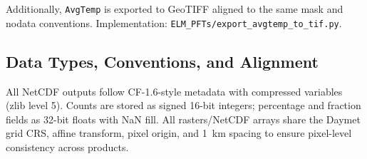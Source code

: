 Additionally, \texttt{AvgTemp} is exported to GeoTIFF aligned to the same mask and nodata conventions. Implementation: \texttt{ELM\_PFTs/export\_avgtemp\_to\_tif.py}.

\subsection{Data Types, Conventions, and Alignment}
All NetCDF outputs follow CF-1.6-style metadata with compressed variables (zlib level 5). Counts are stored as signed 16-bit integers; percentage and fraction fields as 32-bit floats with NaN fill. All rasters/NetCDF arrays share the Daymet grid CRS, affine transform, pixel origin, and 1~km spacing to ensure pixel-level consistency across products.


